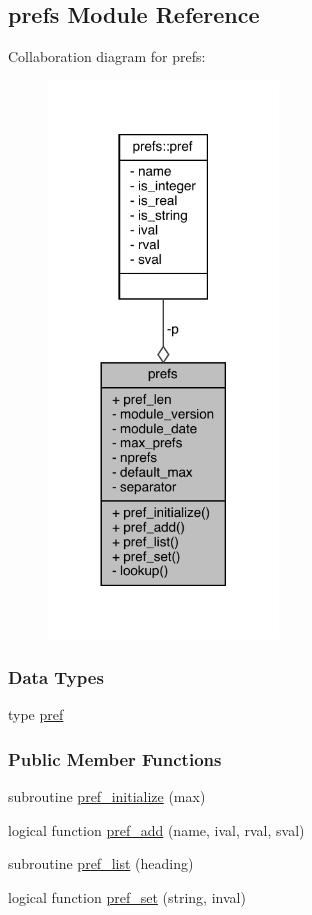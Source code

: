 \hypertarget{classprefs}{\subsection{prefs Module Reference}
\label{classprefs}
}


Collaboration diagram for prefs\-:
\nopagebreak
\begin{figure}[H]
\begin{center}
\leavevmode
\includegraphics[width=173pt]{classprefs__coll__graph}
\end{center}
\end{figure}
\subsubsection*{Data Types}
\begin{DoxyCompactItemize}
\item 
type \hyperlink{structprefs_1_1pref}{pref}
\end{DoxyCompactItemize}
\subsubsection*{Public Member Functions}
\begin{DoxyCompactItemize}
\item 
subroutine \hyperlink{classprefs_a7e49e1283a498b6cbf9c1d71873e79fb}{pref\-\_\-initialize} (max)
\item 
logical function \hyperlink{classprefs_aa04b94a9df33fe4125affec885928c02}{pref\-\_\-add} (name, ival, rval, sval)
\item 
subroutine \hyperlink{classprefs_abd655a58c96c894db46e180768bea05f}{pref\-\_\-list} (heading)
\item 
logical function \hyperlink{classprefs_aad2556d1e8d95602cf1c301338df612e}{pref\-\_\-set} (string, inval)
\end{DoxyCompactItemize}
